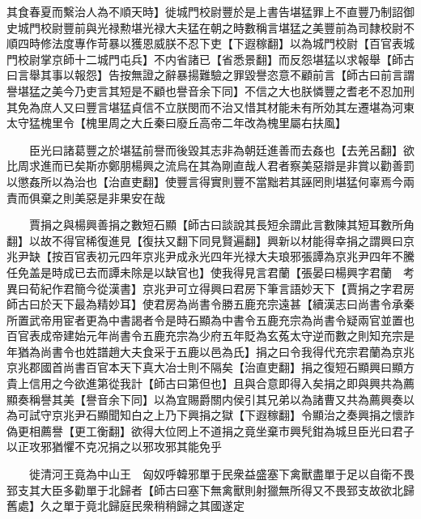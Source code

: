其食春夏而繫治人為不順天時】徙城門校尉豐於是上書告堪猛罪上不直豐乃制詔御史城門校尉豐前與光禄勲堪光禄大夫猛在朝之時數稱言堪猛之美豐前為司隸校尉不順四時修法度專作苛暴以獲恩威朕不忍下吏【下遐稼翻】以為城門校尉【百官表城門校尉掌京師十二城門屯兵】不内省諸已【省悉景翻】而反怨堪猛以求報舉【師古曰言舉其事以報怨】告按無證之辭暴揚難驗之罪毀譽恣意不顧前言【師古曰前言謂譽堪猛之美今乃吏言其短是不顧也譽音余下同】不信之大也朕憐豐之耆老不忍加刑其免為庶人又曰豐言堪猛貞信不立朕閔而不治又惜其材能未有所効其左遷堪為河東太守猛槐里令【槐里周之大丘秦曰廢丘高帝二年改為槐里屬右扶風】

　　臣光曰諸葛豐之於堪猛前譽而後毀其志非為朝廷進善而去姦也【去羌呂翻】欲比周求進而已矣斯亦鄭朋楊興之流烏在其為剛直哉人君者察美惡辯是非賞以勸善罰以懲姦所以為治也【治直吏翻】使豐言得實則豐不當黜若其誣罔則堪猛何辜焉今兩責而俱棄之則美惡是非果安在哉

　　賈捐之與楊興善捐之數短石顯【師古曰談說其長短余謂此言數陳其短耳數所角翻】以故不得官稀復進見【復扶又翻下同見賢遍翻】興新以材能得幸捐之謂興曰京兆尹缺【按百官表初元四年京兆尹成永光四年光禄大夫琅邪張譚為京兆尹四年不騰任免盖是時成已去而譚未除是以缺官也】使我得見言君蘭【張晏曰楊興字君蘭　考異曰荀紀作君簡今從漢書】京兆尹可立得興曰君房下筆言語妙天下【賈捐之字君房師古曰於天下最為精妙耳】使君房為尚書令勝五鹿充宗遠甚【續漢志曰尚書令承秦所置武帝用宦者更為中書謁者令是時石顯為中書令五鹿充宗為尚書令疑兩官並置也百官表成帝建始元年尚書令五鹿充宗為少府五年貶為玄菟太守逆而數之則知充宗是年猶為尚書令也姓譜趙大夫食采于五鹿以邑為氏】捐之曰令我得代充宗君蘭為京兆京兆郡國首尚書百官本天下真大冶士則不隔矣【治直吏翻】捐之復短石顯興曰顯方貴上信用之今欲進第從我計【師古曰第但也】且與合意即得入矣捐之即與興共為薦顯奏稱譽其美【譽音余下同】以為宜賜爵關内侯引其兄弟以為諸曹又共為薦興奏以為可試守京兆尹石顯聞知白之上乃下興捐之獄【下遐稼翻】令顯治之奏興捐之懷詐偽更相薦譽【更工衡翻】欲得大位罔上不道捐之竟坐棄市興髠鉗為城旦臣光曰君子以正攻邪猶懼不克况捐之以邪攻邪其能免乎

　　徙清河王竟為中山王　匈奴呼韓邪單于民衆益盛塞下禽獸盡單于足以自衛不畏郅支其大臣多勸單于北歸者【師古曰塞下無禽獸則射獵無所得又不畏郅支故欲北歸舊處】久之單于竟北歸庭民衆稍稍歸之其國遂定

